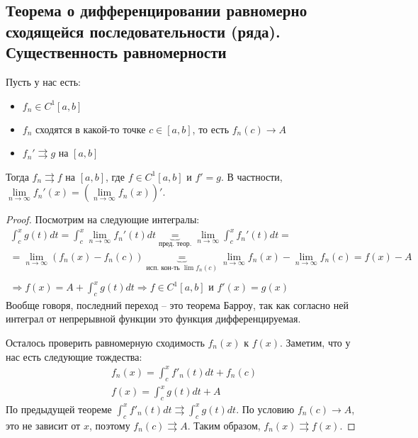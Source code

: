 \subsection{Теорема о дифференцировании равномерно сходящейся последовательности (ряда). Существенность равномерности}
\begin{theorem} Пусть у нас есть:
    \begin{itemize}
       \item $f_n \in C^1[a, b]$
       \item $f_n$ сходятся в какой-то точке $c \in [a, b]$, то есть $f_n(c) \to A$
       \item $f_n' \rightrightarrows g$ на $[a, b]$
   \end{itemize}
   Тогда $f_n \rightrightarrows f$ на $[a, b]$, где $f \in C^1[a, b]$ и $f' = g$. В частности, $\lim\limits_{n \to \infty} f_n'(x) = (\lim\limits_{n \to \infty} f_n(x))'$.
\end{theorem}
\begin{proof}
   Посмотрим на следующие интегралы:
   \begin{gather*}
       \int_c^x g(t)dt = \int_c^x \lim\limits_{n \to \infty} f_n'(t)dt \underbrace{=}_{\text{пред. теор.}} \lim\limits_{n \to \infty} \int_c^x  f_n'(t)dt = \\
       = \lim\limits_{n \to \infty} (f_n(x) - f_n(c)) \underbrace{=}_{\text{исп. кон-ть $\lim f_n(c)$}} \lim\limits_{n \to \infty} f_n(x) - \lim\limits_{n \to \infty} f_n(c) = f(x) - A \\ 
       \\
       \Rightarrow f(x) = A + \int_c^x g(t)dt \Rightarrow f \in C^1[a, b] \text{ и } f'(x) = g(x)
   \end{gather*}
   \quad Вообще говоря, последний переход -- это теорема Барроу, так как согласно ней интеграл от непрерывной функции это функция дифференцируемая.

   \quad Осталось проверить равномерную сходимость $f_n(x)$ к $f(x)$.
   Заметим, что у нас есть следующие тождества:
   \begin{gather*}
       f_n(x) = \int_c^x f'_n(t)dt + f_n(c) \\
       f(x) = \int_c^x g(t)dt + A
   \end{gather*}
   По предыдущей теореме $\int_c^x f'_n(t)dt \rightrightarrows \int_c^x g(t)dt$. 
   По условию $f_n(c) \to A$, это не зависит от $x$, поэтому $f_n(c) \rightrightarrows A$.
   Таким образом, $f_n(x) \rightrightarrows f(x)$.
\end{proof}

